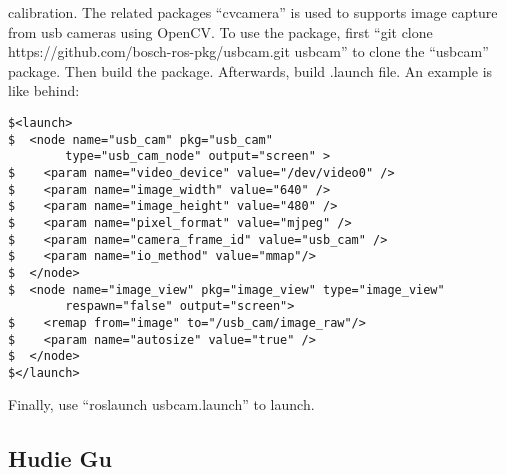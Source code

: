 \documentclass[paper=a4, fontsize=11pt]{scrartcl} %
\numberwithin{equation}{section} %
\numberwithin{figure}{section} %
\numberwithin{table}{section} %
\begin{document}
\begin{enumerate}
calibration. The related packages “cv\underline{\hspace{0.5em}}camera” is used to supports image capture from usb cameras using OpenCV. To use the package, first “git clone https://github.com/bosch-ros-pkg/usb\underline{\hspace{0.5em}}cam.git usb\underline{\hspace{0.5em}}cam” to clone the “usb\underline{\hspace{0.5em}}cam” package. Then  build the package. Afterwards, build .launch file. An example is like behind:

\lstset{
    xleftmargin=2em,xrightmargin=2em, aboveskip=1em,
    framexleftmargin=2em
} 
\begin{lstlisting}
$<launch>
$  <node name="usb_cam" pkg="usb_cam" 
        type="usb_cam_node" output="screen" >
$    <param name="video_device" value="/dev/video0" />
$    <param name="image_width" value="640" />
$    <param name="image_height" value="480" />
$    <param name="pixel_format" value="mjpeg" />
$    <param name="camera_frame_id" value="usb_cam" />
$    <param name="io_method" value="mmap"/>
$  </node>
$  <node name="image_view" pkg="image_view" type="image_view"
        respawn="false" output="screen">
$    <remap from="image" to="/usb_cam/image_raw"/>
$    <param name="autosize" value="true" />
$  </node>
$</launch>
\end{lstlisting}

\begin{flushleft}
Finally, use “roslaunch usb\underline{\hspace{0.5em}}cam.launch” to launch.
\end{flushleft}

\end{enumerate}

\subsection{Hudie Gu}
\end{document}
